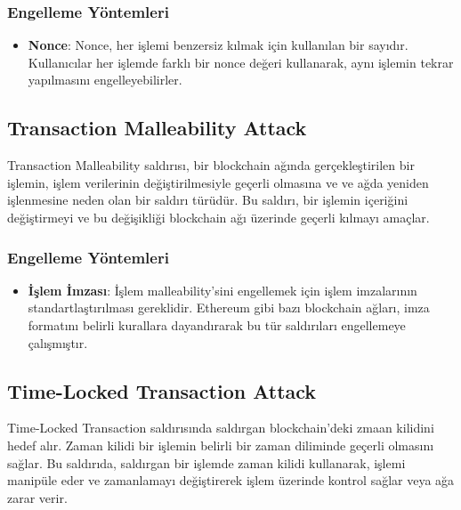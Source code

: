 \subsubsection{Engelleme Yöntemleri}

\begin{itemize}
    \item \textbf{Nonce}: Nonce, her işlemi benzersiz kılmak için kullanılan bir sayıdır. Kullanıcılar her işlemde farklı bir nonce değeri kullanarak, aynı işlemin tekrar yapılmasını engelleyebilirler.
\end{itemize}

\newpage

\subsection{Transaction Malleability Attack}

Transaction Malleability saldırısı, bir blockchain ağında gerçekleştirilen bir işlemin, işlem verilerinin değiştirilmesiyle geçerli olmasına ve ve ağda yeniden işlenmesine neden olan bir saldırı türüdür. Bu saldırı, bir işlemin içeriğini değiştirmeyi ve bu değişikliği blockchain ağı üzerinde geçerli kılmayı amaçlar. 

\subsubsection{Engelleme Yöntemleri}

\begin{itemize}
    \item \textbf{İşlem İmzası}: İşlem malleability’sini engellemek için işlem imzalarının standartlaştırılması gereklidir. Ethereum gibi bazı blockchain ağları, imza formatını belirli kurallara dayandırarak bu tür saldırıları engellemeye çalışmıştır.
\end{itemize}

\newpage

\subsection{Time-Locked Transaction Attack}

Time-Locked Transaction saldırısında saldırgan blockchain'deki zmaan kilidini hedef alır. Zaman kilidi bir işlemin belirli bir zaman diliminde geçerli olmasını sağlar. Bu saldırıda, saldırgan bir işlemde zaman kilidi kullanarak, işlemi manipüle eder ve zamanlamayı değiştirerek işlem üzerinde kontrol sağlar veya ağa zarar verir.

